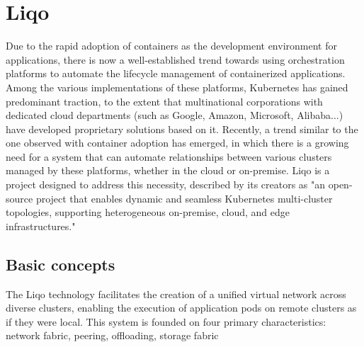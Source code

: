\chapter{Liqo}

Due to the rapid adoption of containers as the development environment for applications, there is now a well-established trend towards using orchestration platforms to automate the lifecycle management of containerized applications. Among the various implementations of these platforms, Kubernetes has gained predominant traction, to the extent that multinational corporations with dedicated cloud departments (such as Google, Amazon, Microsoft, Alibaba...) have developed proprietary solutions based on it. Recently, a trend similar to the one observed with container adoption has emerged, in which there is a growing need for a system that can automate relationships between various clusters managed by these platforms, whether in the cloud or on-premise. Liqo is a project designed to address this necessity, described by its creators as "an open-source project that enables dynamic and seamless Kubernetes multi-cluster topologies, supporting heterogeneous on-premise, cloud, and edge infrastructures."

\section{Basic concepts}
The Liqo technology facilitates the creation of a unified virtual network across diverse clusters, enabling the execution of application pods on remote clusters as if they were local. This system is founded on four primary characteristics: network fabric, peering, offloading, storage fabric

